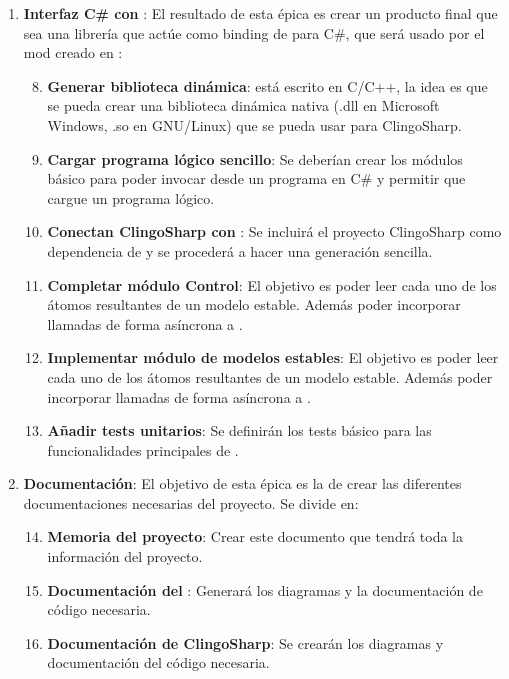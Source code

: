 \begin{enumerate}
	\item \textbf{Interfaz C\# con \clingo}: El resultado de esta épica es crear un producto final que sea una librería que actúe como binding de \clingo para C\#, que será usado por el mod creado en \cities:
	\begin{enumerate}[label={\arabic*.}]
		\setcounter{enumii}{7}
		\item \textbf{Generar biblioteca dinámica}: \clingo está escrito en C/C++, la idea es que se pueda crear una biblioteca dinámica nativa (.dll en Microsoft Windows, .so en GNU/Linux) que se pueda usar para ClingoSharp.
		\item \textbf{Cargar programa lógico sencillo}: Se deberían crear los módulos básico para poder invocar \clingo desde un programa en C\# y permitir que cargue un programa lógico.
		\item \textbf{Conectan ClingoSharp con \industrylp}: Se incluirá el proyecto ClingoSharp como dependencia de \industrylp y se procederá a hacer una generación sencilla.
		\item \textbf{Completar módulo Control}: El objetivo es poder leer cada uno de los átomos resultantes de un modelo estable. Además poder incorporar llamadas de forma asíncrona a \clingo.
		\item \textbf{Implementar módulo de modelos estables}: El objetivo es poder leer cada uno de los átomos resultantes de un modelo estable. Además poder incorporar llamadas de forma asíncrona a \clingo.
		\item \textbf{Añadir tests unitarios}: Se definirán los tests básico para las funcionalidades principales de \clingo.
	\end{enumerate}

	\item \textbf{Documentación}: El objetivo de esta épica es la de crear las diferentes documentaciones necesarias del proyecto. Se divide en:
	\begin{enumerate}[label={\arabic*.}]
		\setcounter{enumii}{13}
		\item \textbf{Memoria del proyecto}: Crear este documento que tendrá toda la información del proyecto.
		\item \textbf{Documentación del \industrylp}: Generará los diagramas y la documentación de código necesaria.
		\item \textbf{Documentación de ClingoSharp}: Se crearán los diagramas y documentación del código necesaria.
	\end{enumerate}
\end{enumerate}

